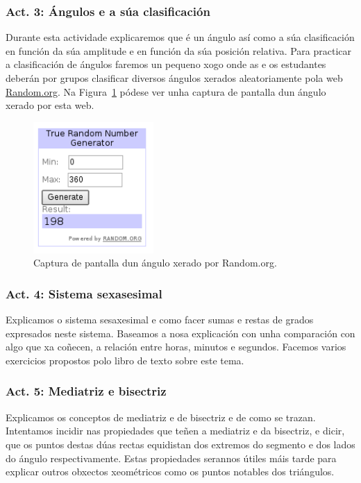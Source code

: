 \subsubsection{Act. 3: Ángulos e a súa clasificación}\label{act3}
Durante esta actividade explicaremos que é un ángulo así como a súa clasificación en función da súa amplitude e en función da súa posición relativa. Para practicar a clasificación de ángulos faremos un pequeno xogo onde as e os estudantes deberán por grupos clasificar diversos ángulos xerados aleatoriamente pola web \href{http://random.org}{Random.org}. Na Figura~\ref{fig:act5} pódese ver unha captura de pantalla dun ángulo xerado por esta web.

\begin{figure}[h!]
  \centering
  \includegraphics[height=5cm]{img/random.png}
  \caption{Captura de pantalla dun ángulo xerado por Random.org.}\label{fig:act5}
\end{figure}

\subsubsection{Act. 4: Sistema sexasesimal}
Explicamos o sistema sesaxesimal e como facer sumas e restas de grados expresados neste sistema. Baseamos a nosa explicación con unha comparación con algo que xa coñecen, a relación entre horas, minutos e segundos. Facemos varios exercicios propostos polo libro de texto sobre este tema.

\subsubsection{Act. 5: Mediatriz e bisectriz}
Explicamos os conceptos de mediatriz e de bisectriz e de como se trazan. Intentamos incidir nas propiedades que teñen a mediatriz e da bisectriz, e dicir, que os puntos destas dúas rectas equidistan dos extremos do segmento e dos lados do ángulo respectivamente. Estas propiedades serannos útiles máis tarde para explicar outros obxectos xeométricos como os puntos notables dos triángulos.

